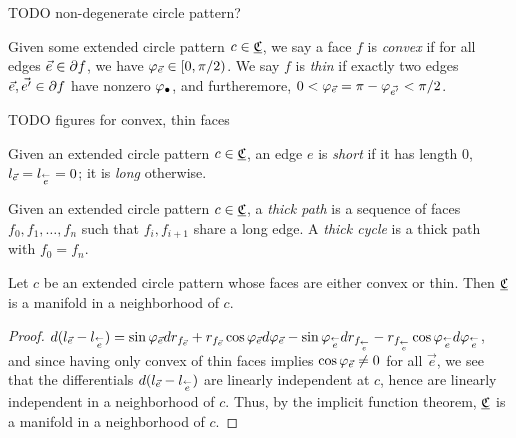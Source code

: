 TODO non-degenerate circle pattern?


\begin{definition}
Given some extended circle pattern $c \in {\underline{\mathfrak{C}}}$,
we say a face $f$ is \emph{convex} if for all edges $\vec{e} \in \partial f$,
we have $\varphi_{\vec{e}} \in [0,\pi/2)$.
We say $f$ is \emph{thin} if exactly two edges $\vec{e}, \vec{e'} \in \partial f$
have nonzero $\varphi_{\bullet}$, and furtheremore,
	$0 < \varphi_{\vec{e}} = \pi - \varphi_{\vec{e'}} < \pi/2$.
\end{definition}

TODO figures for convex, thin faces

\begin{definition}
Given an extended circle pattern $c\in {\underline{\mathfrak{C}}}$, an edge $e$ is \emph{short}
if it has length 0, $l_{\vec{e}} = l_{\overset{\leftarrow}{e}} = 0$;
it is \emph{long} otherwise.
\end{definition}


\begin{definition}
Given an extended circle pattern $c\in {\underline{\mathfrak{C}}}$, a \emph{thick path}
is a sequence of faces $f_0,f_1,\ldots,f_n$
such that $f_i,f_{i+1}$ share a long edge.
A \emph{thick cycle} is a thick path with $f_0 = f_n$.
\end{definition}



\begin{lemma}
Let $c$ be an extended circle pattern whose faces are either
convex or thin.
Then ${\underline{\mathfrak{C}}}$ is a manifold in a neighborhood of $c$.
\end{lemma}

\begin{proof}
$d(l_{\vec{e}} - l_{\overset{\leftarrow}{e}})
= \sin \varphi_{\vec{e}} d r_{f_{\vec{e}}}
+ r_{f_{\vec{e}}} \cos \varphi_{\vec{e}} d \varphi_{\vec{e}}
- \sin \varphi_{\overset{\leftarrow}{e}} d r_{f_{\overset{\leftarrow}{e}}}
- r_{f_{\overset{\leftarrow}{e}}} \cos \varphi_{\overset{\leftarrow}{e}} d \varphi_{\overset{\leftarrow}{e}}
$,
and since having only convex of thin faces implies
$\cos \varphi_{\vec{e}} \neq 0$ for all $\vec{e}$,
we see that the differentials $d(l_{\vec{e}} - l_{\overset{\leftarrow}{e}})$
are linearly independent at $c$,
hence are linearly independent in a neighborhood of $c$.
Thus, by the implicit function theorem,
${\underline{\mathfrak{C}}}$ is a manifold in a neighborhood of $c$.
\end{proof}

